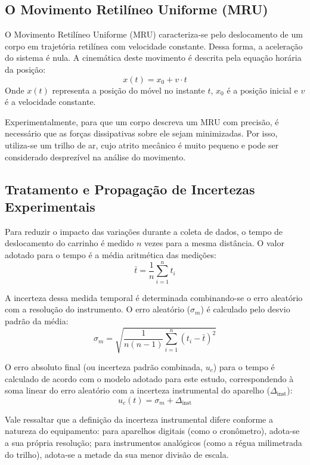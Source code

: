 \documentclass[12pt, a4paper]{article}
\begin{document}
\subsection{O Movimento Retilíneo Uniforme (MRU)}
O Movimento Retilíneo Uniforme (MRU) caracteriza-se pelo deslocamento de um corpo em trajetória retilínea com velocidade constante. Dessa forma, a aceleração do sistema é nula. A cinemática deste movimento é descrita pela equação horária da posição:
\begin{equation}
    x(t) = x_0 + v \cdot t
\end{equation}
Onde $x(t)$ representa a posição do móvel no instante $t$, $x_0$ é a posição inicial e $v$ é a velocidade constante. 

Experimentalmente, para que um corpo descreva um MRU com precisão, é necessário que as forças dissipativas sobre ele sejam minimizadas. Por isso, utiliza-se um trilho de ar, cujo atrito mecânico é muito pequeno e pode ser considerado desprezível na análise do movimento.

\subsection{Tratamento e Propagação de Incertezas Experimentais}
Para reduzir o impacto das variações durante a coleta de dados, o tempo de deslocamento do carrinho é medido $n$ vezes para a mesma distância. O valor adotado para o tempo é a média aritmética das medições:
\begin{equation}
    \bar{t} = \frac{1}{n} \sum_{i=1}^{n} t_i
\end{equation}

A incerteza dessa medida temporal é determinada combinando-se o erro aleatório com a resolução do instrumento. O erro aleatório ($\sigma_m$) é calculado pelo desvio padrão da média:
\begin{equation}
    \sigma_m = \sqrt{\frac{1}{n(n-1)}\sum_{i=1}^{n}(t_i - \bar{t})^2}
\end{equation}

O erro absoluto final (ou incerteza padrão combinada, $u_c$) para o tempo é calculado de acordo com o modelo adotado para este estudo, correspondendo à soma linear do erro aleatório com a incerteza instrumental do aparelho ($\Delta_{\text{inst}}$):
\begin{equation}
    u_c(t) = {\sigma_m + \Delta_{\text{inst}}}
\end{equation}

Vale ressaltar que a definição da incerteza instrumental difere conforme a natureza do equipamento: para aparelhos digitais (como o cronômetro), adota-se a sua própria resolução; para instrumentos analógicos (como a régua milimetrada do trilho), adota-se a metade da sua menor divisão de escala.
\end{document}
